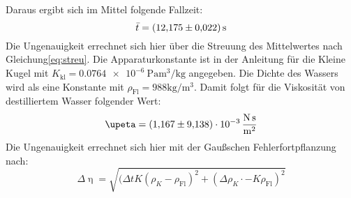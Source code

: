 Daraus ergibt sich im Mittel folgende Fallzeit:
\begin{equation*}
  \label{eq:fallzeit}
  \bar{t}=\SI{12.175\pm0.022}{\second}
\end{equation*}
Die Ungenauigkeit errechnet sich hier über die Streuung des Mittelwertes nach Gleichung\eqref{eq:streu}.
Die Apparaturkonstante ist in der Anleitung für die Kleine Kugel mit $K_\text{kl}=\SI{0.0764e-6}{\pascal\cubic\meter\per\kilo\gram}$\cite{v107} angegeben.
Die Dichte des Wassers wird als eine Konstante mit $\rho_\text{Fl} = 988\si{\kilo\gram\per\cubic\meter}$.
Damit folgt für die Viskosität von destilliertem Wasser folgender Wert:
\begin{equation*}
  \label{eq:vis}
  \upeta = \SI{1.167\pm9.138e-3}{\newton\second\per\meter\squared}
\end{equation*}
Die Ungenauigkeit errechnet sich hier mit der Gaußschen Fehlerfortpflanzung nach:
\begin{equation*}
  \Delta\upeta = \sqrt{(\Delta t K(\rho_K - \rho_\text{Fl})^2 +(\Delta\rho_K \cdot -K \rho_\text{Fl})^2}
\end{equation*}
